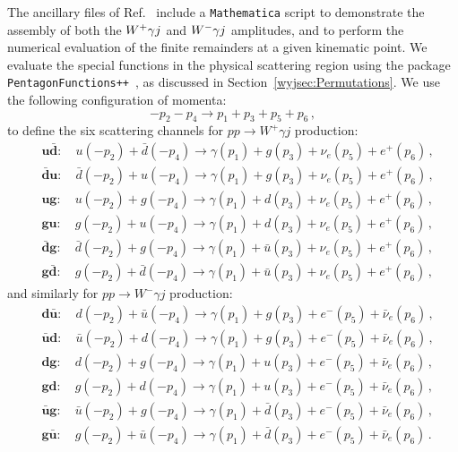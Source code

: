 \documentclass[main.tex]{subfiles}
\begin{document}
The ancillary files of Ref.~\cite{Badger:2022ncb} include a \texttt{Mathematica} script to demonstrate the assembly of both the $W^+\gamma j$ and $W^-\gamma j$ amplitudes, and to perform the numerical evaluation of the finite remainders at a given kinematic point. We evaluate the special functions in the physical scattering region using the package \texttt{PentagonFunctions++}~\cite{Chicherin:2021dyp}, as discussed in Section~\ref{wyjsec:Permutations}. We use the following configuration of momenta:
\begin{equation}
-p_2 - p_4 \to p_1 + p_3 + p_5 + p_6 \,,
\label{Wyjeq:momconfig}
\end{equation}
to define the six scattering channels for $pp\to W^+\gamma j$ production:
\label{Wyjeq:wplus_channel_definition}
\begin{align}
&\mathbf{u\bar{d}}: \quad  u(-p_2) + \bar{d}(-p_4) \to \gamma(p_1) + g(p_3) + \nu_e(p_5) + e^+(p_6) \,, \nonumber \\
&\mathbf{\bar{d}u}: \quad  \bar{d}(-p_2) + u(-p_4) \to \gamma(p_1) + g(p_3) + \nu_e(p_5) + e^+(p_6) \,, \nonumber \\
&\mathbf{ug}:       \quad  u(-p_2) + g(-p_4)       \to \gamma(p_1) + d(p_3) + \nu_e(p_5) + e^+(p_6) \,, \nonumber \\
&\mathbf{gu}:       \quad  g(-p_2) + u(-p_4)       \to \gamma(p_1) + d(p_3) + \nu_e(p_5) + e^+(p_6) \,, \nonumber \\
&\mathbf{\bar{d}g}: \quad  \bar{d}(-p_2) + g(-p_4) \to \gamma(p_1) + \bar{u}(p_3) + \nu_e(p_5) + e^+(p_6) \,, \nonumber \\
&\mathbf{g\bar{d}}: \quad  g(-p_2) + \bar{d}(-p_4) \to \gamma(p_1) + \bar{u}(p_3) + \nu_e(p_5) + e^+(p_6) \,,
\end{align}
and similarly for $pp\to W^-\gamma j$ production:
\label{Wyjeq:wmin_channel_definition}
\begin{align}
&\mathbf{d\bar{u}}: \quad  d(-p_2) + \bar{u}(-p_4) \to \gamma(p_1) + g(p_3)       + e^-(p_5) + \bar\nu_e(p_6) \,, \nonumber \\
&\mathbf{\bar{u}d}: \quad  \bar{u}(-p_2) + d(-p_4) \to \gamma(p_1) + g(p_3)       + e^-(p_5) + \bar\nu_e(p_6) \,, \nonumber\\
&\mathbf{dg}:       \quad  d(-p_2) + g(-p_4)       \to \gamma(p_1) + u(p_3)       + e^-(p_5) + \bar\nu_e(p_6) \,, \nonumber \\
&\mathbf{gd}:       \quad  g(-p_2) + d(-p_4)       \to \gamma(p_1) + u(p_3)       + e^-(p_5) + \bar\nu_e(p_6) \,, \nonumber \\
&\mathbf{\bar{u}g}: \quad  \bar{u}(-p_2) + g(-p_4) \to \gamma(p_1) + \bar{d}(p_3) + e^-(p_5) + \bar\nu_e(p_6) \,, \nonumber \\
&\mathbf{g\bar{u}}: \quad  g(-p_2) + \bar{u}(-p_4) \to \gamma(p_1) + \bar{d}(p_3) + e^-(p_5) + \bar\nu_e(p_6) \,.
\end{align}
\end{document}
